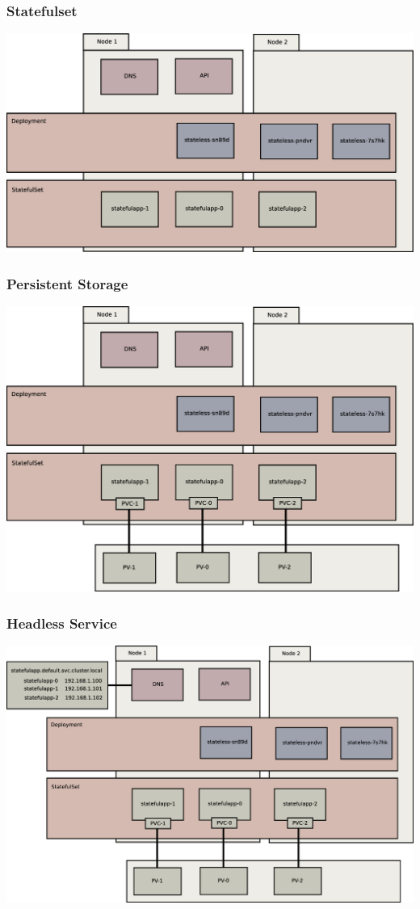 \documentclass{beamer}
\begin{document}
\begin{frame}
    \frametitle{Statefulset}
    \includegraphics[width=\textwidth,height=\textheight,keepaspectratio]{graphics/05-statefulSet.eps}
\end{frame}

\begin{frame}
    \frametitle{Persistent Storage}
    \includegraphics[width=\textwidth,height=\textheight,keepaspectratio]{graphics/06-persistence.eps}
\end{frame}

\begin{frame}
    \frametitle{Headless Service}
    \includegraphics[width=\textwidth,height=\textheight,keepaspectratio]{graphics/07-persistentIdentity.eps}
\end{frame}
\end{document}
